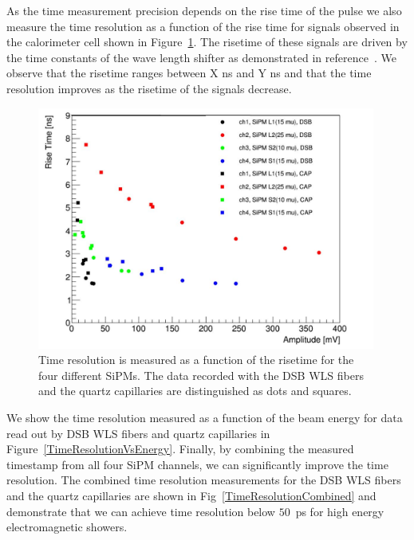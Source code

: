 As the time measurement precision depends on the rise time of the pulse we also
measure the time resolution as a function of the rise time for signals observed 
in the calorimeter cell shown in Figure~\ref{RiseTime}. The risetime of these signals 
are driven by the time constants of the wave length shifter as 
demonstrated in reference~\cite{lysotiming}. We observe that the risetime
ranges between X ns and Y ns and that the time resolution improves as the 
risetime of the signals decrease. 

%
\begin{figure}[htb]
\includegraphics[width=0.99\textwidth]{RiseTime.pdf}
\caption{\label{RiseTime}Time resolution is measured as a function of the risetime
for the four different SiPMs. The data recorded with the DSB WLS fibers and the
quartz capillaries are distinguished as dots and squares. }
\end{figure}
%


We show the time resolution measured as a function of the beam energy for
data read out by DSB WLS fibers and quartz capillaries in 
Figure~\ref{TimeResolutionVsEnergy}. Finally, by combining the measured timestamp
from all four SiPM channels, we can significantly improve the time resolution.
The combined time resolution measurements for the DSB WLS fibers and the quartz capillaries are shown in
Fig~\ref{TimeResolutionCombined} and demonstrate that we can achieve time resolution
below $50$~ps for high energy electromagnetic showers.

